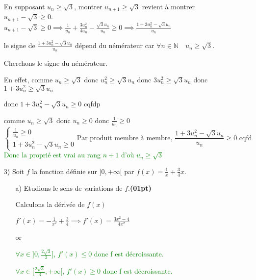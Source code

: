 \documentclass[12pt]{article}
\begin{document}
\begin{enumerate}
En supposant \(u_{n} \geq \sqrt{3}\), montrer \(u_{n+1} \geq \sqrt{3}\) revient à montrer \(u_{n+1}-\sqrt{3} \geq 0\).\\
\(u_{n+1}-\sqrt{3} \geq 0\implies\frac{1}{u_{n}}+\frac{3u_{n}^{2}}{4u_{n}}-\frac{\sqrt{3}u_{n}}{u_{n}} \geq 0 \implies \frac{1+3u_{n}^{2}-\sqrt{3}u_{n}}{u_{n}}\)

le signe de \( \frac{1+3u_{n}^{2}-\sqrt{3}u_{n}}{u_{n}} \)  dépend du némérateur car
\( \forall n \in \mathbb{N}\quad u_{n} \geq \sqrt{3}\).

Cherchons le signe du némérateur.

En effet, comme \(u_{n} \geq \sqrt{3}\) donc \(u_{n}^{2} \geq \sqrt{3}u_{n}\) donc \(3u_{n}^{2} \geq \sqrt{3}u_{n}\)
donc \(1+3u_{n}^{2} \geq \sqrt{3}u_{n}\)

donc \(1+3u_{n}^{2}-\sqrt{3}u_{n} \geq  0\) cqfdp

comme \(u_{n} \geq \sqrt{3}\) donc \(u_{n} \geq 0\) donc \(\frac{1}{u_{n}} \geq 0\) 
\[
\begin{cases}
\frac{1}{u_{n}}\geq 0\\
1+3u_{n}^{2}-\sqrt{3}u_{n} \geq  0
\end{cases} \text{Par produit membre à membre, } \frac{1+3u_{n}^{2}-\sqrt{3}u_{n}}{u_{n}} \geq  0 \text{ cqfd}
\]
\textcolor{green}{Donc la proprié est vrai au rang \(n+1\) d'où \(u_{n} \geq \sqrt{3}\)}
\item[3)] Soit $f$ la fonction définie sur $]0, +\infty[$ par \( f(x) = \frac{1}{x} + \frac{3}{4}x \).
\begin{enumerate}
\item[a)] Etudions le sens de variations de $f$.\hfill\textbf{(01pt)}

Calculons la dérivée de \( f(x)\)

\( f'(x) = -\frac{1}{x^{2}} + \frac{3}{4} \implies f'(x) = \frac{3x^{2}-4}{4x^{2}}\)


 or 
 
\textcolor{green}{\(\forall x\in]0, \frac{2\sqrt{3}}{3}] \), \(f'(x)\leq 0\) donc f est décroissante.}

\textcolor{green}{\(\forall x\in[\frac{2\sqrt{3}}{3}, +\infty[ \), \(f'(x)\geq 0\) donc f est décroissante.}
\end{enumerate}

\end{enumerate}
\end{document}
